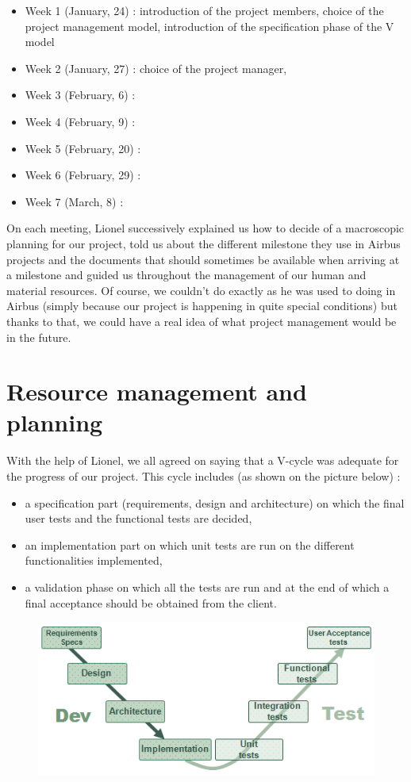 \documentclass{report}
\begin{document}
\begin{itemize}
\item Week 1 (January, 24) : introduction of the project members, choice of the project management model, introduction of the specification phase of the V model
\item Week 2 (January, 27) : choice of the project manager, 
\item Week 3 (February, 6) :
\item Week 4 (February, 9) :
\item Week 5 (February, 20) :
\item Week 6 (February, 29) :
\item Week 7 (March, 8) :
\end{itemize}

On each meeting, Lionel successively explained us how to decide of a macroscopic planning for our project, told us about the different milestone they use in Airbus projects and the documents that should sometimes be available when arriving at a milestone and guided us throughout the management of our human and material resources. Of course, we couldn't do exactly as he was used to doing in Airbus (simply because our project is happening in quite special conditions) but thanks to that, we could have a real idea of what project management would be in the future. 

\section{Resource management and planning}

With the help of Lionel, we all agreed on saying that a V-cycle was adequate for the progress of our project. This cycle includes (as shown on the picture below) :

\begin{itemize}
\item a specification part (requirements, design and architecture) on which the final user tests and the functional tests are decided,
\item an implementation part on which unit tests are run on the different functionalities implemented,
\item a validation phase on which all the tests are run and at the end of which a final acceptance should be obtained from the client.
\end{itemize}

\begin{figure}[!h]
\begin{center}
	\includegraphics[scale=4.5]{VCycle}
\end{center}
\end{figure}
\end{document}
